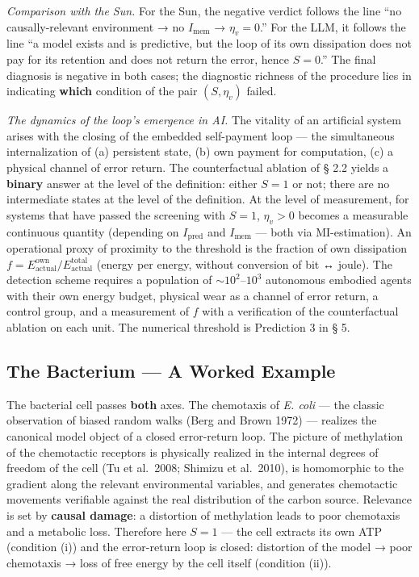 \documentclass[pdflatex,sn-mathphys-ay]{sn-jnl}
\begin{document}
\emph{Comparison with the Sun.} For the Sun, the negative verdict follows the line ``no causally-relevant environment → no \(I_{\text{mem}}\) → \(\eta_v = 0\).'' For the LLM, it follows the line ``a model exists and is predictive, but the loop of its own dissipation does not pay for its retention and does not return the error, hence \(S = 0\).'' The final diagnosis is negative in both cases; the diagnostic richness of the procedure lies in indicating \textbf{which} condition of the pair \((S, \eta_v)\) failed.

\emph{The dynamics of the loop's emergence in AI.} The vitality of an artificial system arises with the closing of the embedded self-payment loop --- the simultaneous internalization of (a) persistent state, (b) own payment for computation, (c) a physical channel of error return. The counterfactual ablation of § 2.2 yields a \textbf{binary} answer at the level of the definition: either \(S = 1\) or not; there are no intermediate states at the level of the definition. At the level of measurement, for systems that have passed the screening with \(S = 1\), \(\eta_v > 0\) becomes a measurable continuous quantity (depending on \(I_{\text{pred}}\) and \(I_{\text{mem}}\) --- both via MI-estimation). An operational proxy of proximity to the threshold is the fraction of own dissipation \(f = E_{\text{actual}}^{\text{own}}/E_{\text{actual}}^{\text{total}}\) (energy per energy, without conversion of bit ↔ joule). The detection scheme requires a population of \(\sim 10^2\)--\(10^3\) autonomous embodied agents with their own energy budget, physical wear as a channel of error return, a control group, and a measurement of \(f\) with a verification of the counterfactual ablation on each unit. The numerical threshold is Prediction 3 in § 5.

\subsection{The Bacterium --- A Worked Example}\label{the-bacterium-a-worked-example}

The bacterial cell passes \textbf{both} axes. The chemotaxis of \emph{E. coli} --- the classic observation of biased random walks (Berg and Brown 1972) --- realizes the canonical model object of a closed error-return loop. The picture of methylation of the chemotactic receptors is physically realized in the internal degrees of freedom of the cell (Tu et al.~2008; Shimizu et al.~2010), is homomorphic to the gradient along the relevant environmental variables, and generates chemotactic movements verifiable against the real distribution of the carbon source. Relevance is set by \textbf{causal damage}: a distortion of methylation leads to poor chemotaxis and a metabolic loss. Therefore here \(S = 1\) --- the cell extracts its own ATP (condition (i)) and the error-return loop is closed: distortion of the model → poor chemotaxis → loss of free energy by the cell itself (condition (ii)).
\end{document}

